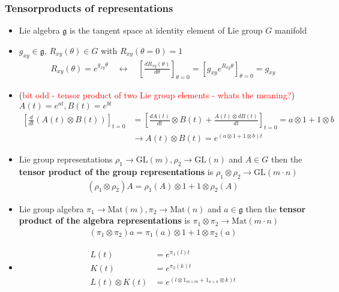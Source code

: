 \documentclass[../main.tex]{subfiles}
\begin{document}
\subsubsection{Tensorproducts of representations}
\begin{itemize}
\item Lie algebra $\mathfrak{g}$ is the tangent space at identity element of Lie group $G$ manifold
\item $g_{xy}\in\mathfrak{g}$, $R_{xy}(\theta)\in G$ with $R_{xy}(\theta=0)=1$
\begin{align}
R_{xy}(\theta)
=e^{g_{xy}\theta}\quad\leftrightarrow\quad
\left[\frac{dR_{xy}(\theta)}{d\theta}\right]_{\theta=0}
=\left[g_{xy}e^{R_{xy}\theta}\right]_{\theta=0}=g_{xy}
\end{align}
\item (\textcolor{red}{bit odd - tensor product of two Lie group elements - whats the meaning?}) $A(t)=e^{at}, B(t)=e^{bt}$
\begin{align}
\left[\frac{d}{dt}(A(t)\otimes B(t))\right]_{t=0}
&=\left[\frac{dA(t)}{dt}\otimes B(t)+\frac{A(t)\otimes dB(t)}{dt}\right]_{t=0}
=a\otimes 1+1\otimes b\\
&\rightarrow
A(t)\otimes B(t)=e^{(a\otimes 1+1\otimes b)t}
\end{align}
\item Lie group representations $\rho_1\rightarrow\text{GL}(m), \rho_2\rightarrow\text{GL}(n)$ and $A\in G$ then the {\bf tensor product of the group representations} is $\rho_1\otimes\rho_2\rightarrow\text{GL}(m\cdot n)$
\begin{align}
(\rho_1\otimes\rho_2)A=\rho_1(A)\otimes1+1\otimes\rho_2(A)
\end{align}
\item Lie group algebra $\pi_1\rightarrow\text{Mat}(m), \pi_2\rightarrow\text{Mat}(n)$ and $a\in \mathfrak{g}$ then the {\bf tensor product of the algebra representations} is $\pi_1\otimes\pi_2\rightarrow\text{Mat}(m\cdot n)$
\begin{align}
(\pi_1\otimes\pi_2)a=\pi_1(a)\otimes1+1\otimes\pi_2(a)
\end{align}
\item 
\begin{align}
L(t)&=e^{\pi_1(l)t}\\
K(t)&=e^{\pi_2(k)t}\\
L(t)\otimes K(t)&=e^{(l\otimes1_{m\times m}+1_{n\times n}\otimes k)t}
\end{align}


\end{itemize}
\end{document}
